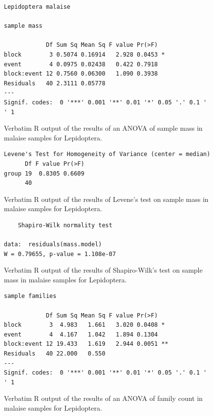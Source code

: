 \documentclass[10pt,letterpaper,twocolumn]{article}
\begin{document}
\begin{figure}[h]
	\lstset{numbers=left}
	\lstset{xleftmargin=5mm,framexleftmargin=5mm}
	\begin{lstlisting}
Lepidoptera malaise 

sample mass 

            Df Sum Sq Mean Sq F value Pr(>F)  
block        3 0.5074 0.16914   2.928 0.0453 *
event        4 0.0975 0.02438   0.422 0.7918  
block:event 12 0.7560 0.06300   1.090 0.3938  
Residuals   40 2.3111 0.05778                 
---
Signif. codes:  0 '***' 0.001 '**' 0.01 '*' 0.05 '.' 0.1 ' ' 1
	\end{lstlisting}
	\caption{Verbatim R output of the results of an ANOVA of sample mass in malaise samples for Lepidoptera.}
	\label{fig:malaise_lepidoptera_mass_anova}
	\smallskip
	\nointerlineskip
	\hrulefill
\end{figure}

\begin{figure}[h]
	\lstset{numbers=left}
	\lstset{xleftmargin=5mm,framexleftmargin=5mm}
	\begin{lstlisting}
Levene's Test for Homogeneity of Variance (center = median)
      Df F value Pr(>F)
group 19  0.8305 0.6609
      40               
	\end{lstlisting}
	\caption{Verbatim R output of the results of Levene's test on sample mass in malaise samples for Lepidoptera.}
	\label{fig:malaise_lepidoptera_mass_levene}
	\smallskip
	\nointerlineskip
	\hrulefill
\end{figure}

\begin{figure}[h]
	\lstset{numbers=left}
	\lstset{xleftmargin=5mm,framexleftmargin=5mm}
	\begin{lstlisting}
	Shapiro-Wilk normality test

data:  residuals(mass.model)
W = 0.79655, p-value = 1.108e-07
	\end{lstlisting}
	\caption{Verbatim R output of the results of Shapiro-Wilk's test on sample mass in malaise samples for Lepidoptera.}
	\label{fig:malaise_lepidoptera_mass_shapiro}
	\smallskip
	\nointerlineskip
	\hrulefill
\end{figure}

\begin{figure}[h]
	\lstset{numbers=left}
	\lstset{xleftmargin=5mm,framexleftmargin=5mm}
	\begin{lstlisting}
sample families 

            Df Sum Sq Mean Sq F value Pr(>F)   
block        3  4.983   1.661   3.020 0.0408 * 
event        4  4.167   1.042   1.894 0.1304   
block:event 12 19.433   1.619   2.944 0.0051 **
Residuals   40 22.000   0.550                  
---
Signif. codes:  0 '***' 0.001 '**' 0.01 '*' 0.05 '.' 0.1 ' ' 1
	\end{lstlisting}
	\caption{Verbatim R output of the results of an ANOVA of family count in malaise samples for Lepidoptera.}
	\label{fig:malaise_lepidoptera_family_anova}
	\smallskip
	\nointerlineskip
	\hrulefill
\end{figure}
\end{document}
